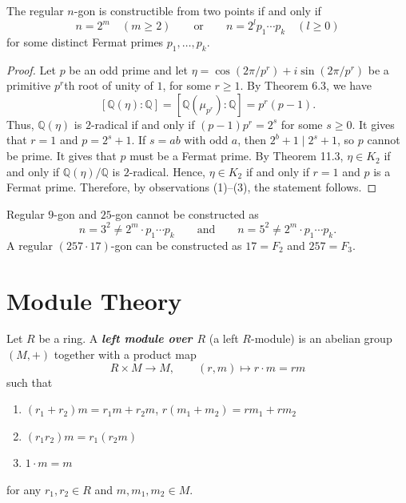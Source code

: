 \documentclass[twoside]{article}
\newcommand\Q{\mathbb Q}
\theoremstyle{remark}
\newcounter{theorem}
\newcommand*\term[1]{\textbf{\textit{\mathversion{bold}#1}}}
\begin{document}
\begin{theorem}
  The regular \(n\)-gon is constructible from two points if and only if
  \[ n = 2^m \quad (m \geq 2) \qquad \text{or} \qquad n = 2^l p_1 \cdots p_k \quad (l \geq 0) \]
  for some distinct Fermat primes \(p_1, \dots, p_k\).
\end{theorem}

\begin{proof}
  Let \(p\) be an odd prime and let \(\eta = \cos(2\pi/p^r) + i \sin (2\pi/p^r)\) be a primitive \(p^r\)th root of unity of \(1\), for some \(r \geq 1\). By Theorem 6.3, we have
  \[ [\Q(\eta):\Q] = [\Q(\mu_{p^r}):\Q] = p^r(p-1). \]
  Thus, \(\Q(\eta)\) is \(2\)-radical if and only if \((p-1)p^r = 2^s\) for some \(s \geq 0\). It gives that \(r=1\) and \(p = 2^s+1\). If \(s = ab\) with odd \(a\), then \(2^b+1 \mid 2^s+1\), so \(p\) cannot be prime. It gives that \(p\) must be a Fermat prime. By Theorem 11.3, \(\eta \in K_2\) if and only if \(\Q(\eta)/\Q\) is \(2\)-radical. Hence, \(\eta \in K_2\) if and only if \(r=1\) and \(p\) is a Fermat prime. Therefore, by observations (1)--(3), the statement follows.
\end{proof}

\begin{example}
  Regular \(9\)-gon and \(25\)-gon cannot be constructed as
  \[ n = 3^2 \neq 2^m \cdot p_1 \cdots p_k \qquad \text{and} \qquad n = 5^2 \neq 2^m \cdot p_1 \cdots p_k. \]
  A regular \((257 \cdot 17)\)-gon can be constructed as \(17 = F_2\) and \(257 = F_3\).
\end{example}

\clearpage


\part{Module Theory}

\begin{definition}
  Let \(R\) be a ring. A \term{left module over \(R\)} (a left \(R\)-module) is an abelian group \((M,{+})\) together with a product map
  \[ R \times M \longrightarrow M, \qquad (r,m) \longmapsto r \cdot m = rm \]
  such that
  \begin{enumerate}[nosep, label=(\roman*)]
    \item \((r_1+r_2) m = r_1 m + r_2 m\), \(r(m_1 + m_2) = rm_1 + rm_2\)
    \item \((r_1r_2)m = r_1(r_2m)\)
    \item \(1 \cdot m = m\)
  \end{enumerate}
  for any \(r_1, r_2 \in R\) and \(m, m_1, m_2 \in M\).
\end{definition}
\end{document}
